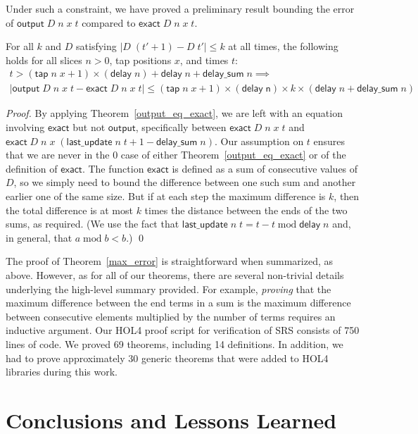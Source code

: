 \documentclass{llncs}
\begin{document}
Under such a constraint, we have proved a preliminary result bounding the error of $\mathsf{output}\;D\;n\;x\;t$ compared to $\mathsf{exact}\;D\;n\;x\;t$.
\begin{theorem}\label{max_error}
For all $k$ and $D$ satisfying $|D\;(t'+1)-D\;t'|\leq k$ at all times, the following holds for all slices $n>0$, tap positions $x$, and times $t$:
\begin{multline*}
t>(\mathsf{tap}\;n\;x+1)\times(\mathsf{delay}\;n)+\mathsf{delay}\;n+\mathsf{delay\_sum}\;n\implies\\
|\mathsf{output}\;D\;n\;x\;t-\mathsf{exact}\;D\;n\;x\;t|\leq(\mathsf{tap}\;n\;x+1)\times(\mathsf{delay\;n})\times k\times(\mathsf{delay}\;n+\mathsf{delay\_sum}\;n)
\end{multline*}
\end{theorem}
\begin{proof}
By applying Theorem~\ref{output_eq_exact}, we are left with an equation involving $\mathsf{exact}$ but not $\mathsf{output}$, specifically between $\mathsf{exact}\;D\;n\;x\;t$ and $\mathsf{exact}\;D\;n\;x\;(\mathsf{last\_update}\;n\;t+1-\mathsf{delay\_sum}\;n)$.
Our assumption on $t$ ensures that we are never in the $0$ case of either Theorem~\ref{output_eq_exact} or of the definition of $\mathsf{exact}$.
The function $\mathsf{exact}$ is defined as a sum of consecutive values of $D$, so we simply need to bound the difference between one such sum and another earlier one of the same size.
But if at each step the maximum difference is $k$, then the total difference is at most $k$ times the distance between the ends of the two sums, as required.
(We use the fact that $\mathsf{last\_update}\;n\;t=t-t\operatorname{mod}\mathsf{delay}\;n$ and, in general, that $a\operatorname{mod}b<b$.) \qed
\end{proof}

The proof of Theorem~\ref{max_error} is straightforward when summarized, as above.
However, as for all of our theorems, there are several non-trivial details underlying the high-level summary provided.
For example, \emph{proving} that the maximum difference between the end terms in a sum is the maximum difference between consecutive elements multiplied by the number of terms requires an inductive argument.
Our HOL4 proof script for verification of SRS consists of 750 lines of code.
We proved 69 theorems, including 14 definitions.
In addition, we had to prove approximately 30 generic theorems that were added to HOL4 libraries during this work.

\section{Conclusions and Lessons Learned}
\label{sec-conclusions}
\end{document}
